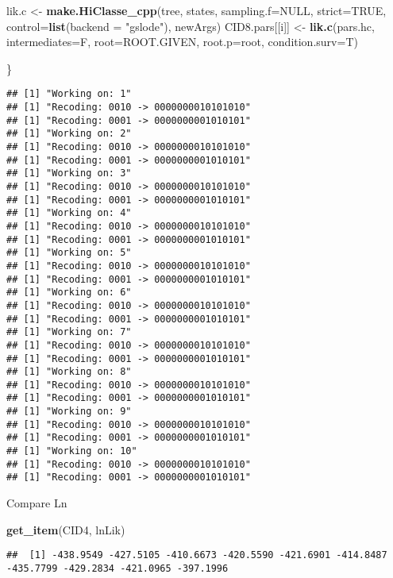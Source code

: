 \documentclass[
]{article}
\newenvironment{Shaded}{\begin{snugshade}}{\end{snugshade}}
\newcommand{\AttributeTok}[1]{\textcolor[rgb]{0.13,0.29,0.53}{#1}}
\newcommand{\ConstantTok}[1]{\textcolor[rgb]{0.56,0.35,0.01}{#1}}
\newcommand{\FunctionTok}[1]{\textcolor[rgb]{0.13,0.29,0.53}{\textbf{#1}}}
\newcommand{\NormalTok}[1]{#1}
\newcommand{\OtherTok}[1]{\textcolor[rgb]{0.56,0.35,0.01}{#1}}
\newcommand{\StringTok}[1]{\textcolor[rgb]{0.31,0.60,0.02}{#1}}
\begin{document}
\begin{Shaded}
\begin{Highlighting}[]
\NormalTok{  lik.c }\OtherTok{\textless{}{-}} \FunctionTok{make.HiClasse\_cpp}\NormalTok{(tree, states,  }\AttributeTok{sampling.f=}\ConstantTok{NULL}\NormalTok{,  }\AttributeTok{strict=}\ConstantTok{TRUE}\NormalTok{, }\AttributeTok{control=}\FunctionTok{list}\NormalTok{(}\AttributeTok{backend =} \StringTok{"gslode"}\NormalTok{), newArgs)}
\NormalTok{  CID8.pars[[i]] }\OtherTok{\textless{}{-}} \FunctionTok{lik.c}\NormalTok{(pars.hc, }\AttributeTok{intermediates=}\NormalTok{F, }\AttributeTok{root=}\NormalTok{ROOT.GIVEN, }\AttributeTok{root.p=}\NormalTok{root, }\AttributeTok{condition.surv=}\NormalTok{T)}
  
\NormalTok{\}}
\end{Highlighting}
\end{Shaded}

\begin{verbatim}
## [1] "Working on: 1"
## [1] "Recoding: 0010 -> 0000000010101010"
## [1] "Recoding: 0001 -> 0000000001010101"
## [1] "Working on: 2"
## [1] "Recoding: 0010 -> 0000000010101010"
## [1] "Recoding: 0001 -> 0000000001010101"
## [1] "Working on: 3"
## [1] "Recoding: 0010 -> 0000000010101010"
## [1] "Recoding: 0001 -> 0000000001010101"
## [1] "Working on: 4"
## [1] "Recoding: 0010 -> 0000000010101010"
## [1] "Recoding: 0001 -> 0000000001010101"
## [1] "Working on: 5"
## [1] "Recoding: 0010 -> 0000000010101010"
## [1] "Recoding: 0001 -> 0000000001010101"
## [1] "Working on: 6"
## [1] "Recoding: 0010 -> 0000000010101010"
## [1] "Recoding: 0001 -> 0000000001010101"
## [1] "Working on: 7"
## [1] "Recoding: 0010 -> 0000000010101010"
## [1] "Recoding: 0001 -> 0000000001010101"
## [1] "Working on: 8"
## [1] "Recoding: 0010 -> 0000000010101010"
## [1] "Recoding: 0001 -> 0000000001010101"
## [1] "Working on: 9"
## [1] "Recoding: 0010 -> 0000000010101010"
## [1] "Recoding: 0001 -> 0000000001010101"
## [1] "Working on: 10"
## [1] "Recoding: 0010 -> 0000000010101010"
## [1] "Recoding: 0001 -> 0000000001010101"
\end{verbatim}

Compare Ln

\begin{Shaded}
\begin{Highlighting}[]
\FunctionTok{get\_item}\NormalTok{(CID4, }\StringTok{\textquotesingle{}lnLik\textquotesingle{}}\NormalTok{)}
\end{Highlighting}
\end{Shaded}

\begin{verbatim}
##  [1] -438.9549 -427.5105 -410.6673 -420.5590 -421.6901 -414.8487 -435.7799 -429.2834 -421.0965 -397.1996
\end{verbatim}
\end{document}
